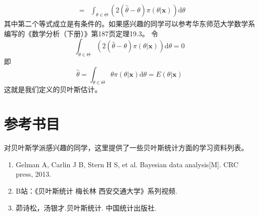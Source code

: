 \begin{remark}
\begin{enumerate}
\begin{eqnarray*}
        &=& \int_{\theta \in \Theta}  \left( 2(\hat{\theta} - \theta) \pi(\theta|\bm{x}) \right)\text{d} \theta
    \end{eqnarray*}
    其中第二个等式成立是有条件的。如果感兴趣的同学可以参考华东师范大学数学系编写的《数学分析（下册）》第187页定理19.3。
    令
    $$\int_{\theta \in \Theta}  \left( 2(\hat{\theta} - \theta) \pi(\theta|\bm{x}) \right)\text{d} \theta = 0$$
    即
    $$
    \hat{\theta} = \int_{\theta \in \Theta} \theta  \pi(\theta|\bm{x})\text{d} \theta = E(\theta|\bm{x})
    $$
    这就是我们定义的贝叶斯估计。
\end{enumerate}
\end{remark}

\section*{参考书目}
对贝叶斯学派感兴趣的同学，这里提供了一些贝叶斯统计方面的学习资料列表。
\begin{enumerate}
    \item Gelman A, Carlin J B, Stern H S, et al. Bayesian data analysis[M]. CRC press, 2013.
    \item B站：《贝叶斯统计 梅长林 西安交通大学》系列视频.
    \item 茆诗松，汤银才.贝叶斯统计. 中国统计出版社.
\end{enumerate}

